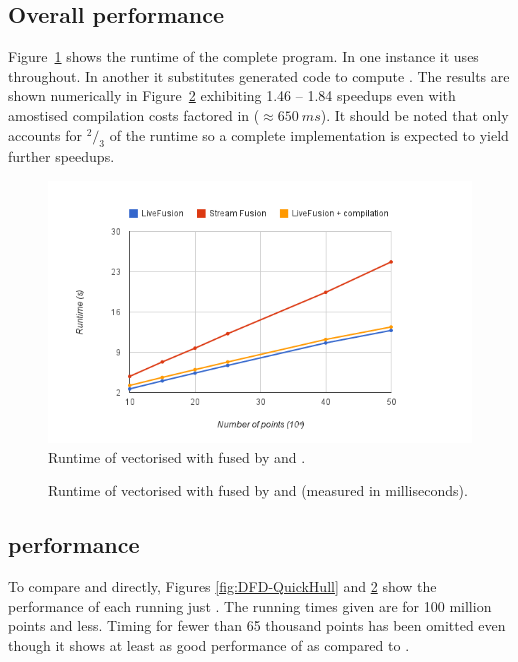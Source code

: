 \documentclass[preamble.tex]{subfiles}
\begin{document}
\subsection{Overall performance}

Figure~\ref{fig:Eval-QuickHull} shows the runtime of the complete \QuickHull program. In one instance it uses \StreamFusion throughout. In another it substitutes \LiveFusion generated code to compute \FilterMax. The results are shown numerically in Figure~\ref{fig:Eval-QuickHull-numbers} exhibiting 1.46 -- 1.84 speedups even with amostised compilation costs factored in ($\approx 650\ ms$). It should be noted that \FilterMax only accounts for $^2/_3$ of the runtime so a complete \LiveFusion implementation is expected to yield further speedups.


\begin{figure}
\includegraphics[scale=0.85,center]{img/Eval-QuickHull}
\caption{Runtime of vectorised \QuickHull with \FilterMax fused by \StreamFusion and \LiveFusion.}
\label{fig:Eval-QuickHull}
\end{figure}


\begin{figure}
\caption{Runtime of vectorised \QuickHull with \FilterMax fused by \StreamFusion and \LiveFusion (measured in milliseconds).}
\label{fig:Eval-QuickHull-numbers}
\end{figure}


\subsection{\FilterMax performance}

To compare \LiveFusion and \StreamFusion directly, Figures \ref{fig:DFD-QuickHull} and \ref{fig:Eval-QuickHull-numbers} show the performance of each running just \FilterMax. The running times given are for 100 million points and less. Timing for fewer than 65 thousand points has been omitted even though it shows at least as good performance of \LiveFusion as compared to \StreamFusion.
\end{document}
